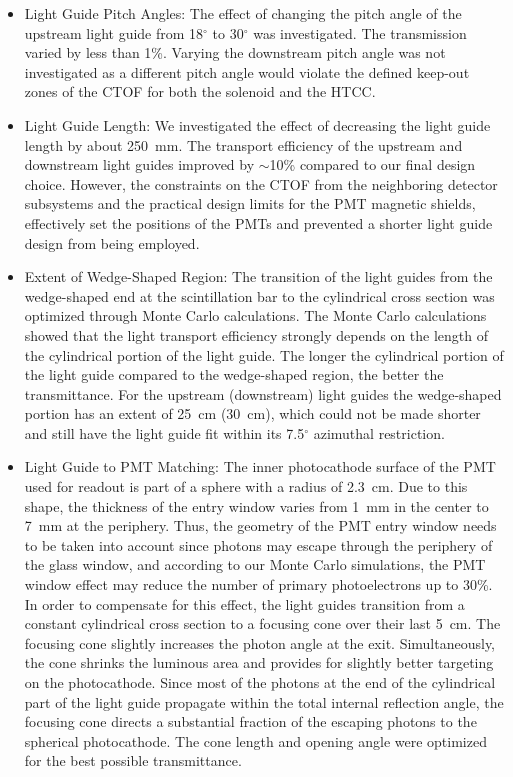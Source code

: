 \documentclass[3p,times,twocolumn]{elsarticle}
\begin{document}
\begin{itemize}

\item Light Guide Pitch Angles: The effect of changing the pitch angle of the upstream light guide from
18$^\circ$ to 30$^\circ$ was investigated. The transmission varied by less than 1\%. Varying the
downstream pitch angle was not investigated as a different pitch angle would violate the defined keep-out
zones of the CTOF for both the solenoid and the HTCC.

\vskip 0.5cm

\item Light Guide Length: We investigated the effect of decreasing the light guide length by about 250~mm.
The transport efficiency of the upstream and downstream light guides improved by $\sim$10\% compared
to our final design choice. However, the constraints on the CTOF from the neighboring detector subsystems
and the practical design limits for the PMT magnetic shields, effectively set the positions of the PMTs and
prevented a shorter light guide design from being employed.

\vskip 0.5cm

\item Extent of Wedge-Shaped Region: The transition of the light guides from the wedge-shaped end at
the scintillation bar to the cylindrical cross section was optimized through Monte Carlo calculations. The
Monte Carlo calculations showed that the light transport efficiency strongly depends on the length of the
cylindrical portion of the light guide. The longer the cylindrical portion of the light guide compared to the
wedge-shaped region, the better the transmittance. For the upstream (downstream) light guides the
wedge-shaped portion has an extent of 25~cm (30~cm), which could not be made shorter and still have the
light guide fit within its 7.5$^\circ$ azimuthal restriction.

\vskip 0.5cm

\item Light Guide to PMT Matching: The inner photocathode surface of the PMT used for readout is part of
a sphere with a radius of 2.3~cm. Due to this shape, the thickness of the entry window varies from 1~mm in
the center to 7~mm at the periphery. Thus, the geometry of the PMT entry window needs to be taken into
account since photons may escape through the periphery of the glass window, and according to our Monte
Carlo simulations, the PMT window effect may reduce the number of primary photoelectrons up to 30\%. In
order to compensate for this effect, the light guides transition from a constant cylindrical cross section to a
focusing cone over their last 5~cm. The focusing cone slightly increases the photon angle at the exit.
Simultaneously, the cone shrinks the luminous area and provides for slightly better targeting on the
photocathode. Since most of the photons at the end of the cylindrical part of the light guide propagate within
the total internal reflection angle, the focusing cone directs a substantial fraction of the escaping photons to
the spherical photocathode. The cone length and opening angle were optimized for the best possible
transmittance. 

\end{itemize}
\end{document}
